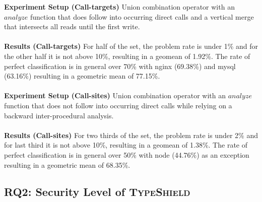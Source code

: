 \textbf{Experiment Setup (Call-targets)}
{Union combination operator with an $analyze$ function that does follow into occurring direct calls  and a vertical merge that intersects all reads until the first write.
}\\~\\
\textbf{Results (Call-targets)}{
For half of the set, the problem rate is under 1\% and for the other half it is not above 10\%, resulting in a geomean of 1.92\%. The rate of perfect classification is in general over 70\% with nginx (69.38\%) and mysql (63.16\%)  resulting in a geometric mean of 77.15\%.
}\\~\\
\textbf{Experiment Setup (Call-sites)}
{ Union combination operator with an $analyze$ function that does not follow into occurring direct calls while relying on a backward inter-procedural analysis.
}\\~\\
\textbf{Results (Call-sites)} {
For two thirds of the set, the problem rate is under 2\% and for last third it is not above 10\%, resulting in a geomean of 1.38\%.  The rate of perfect classification is in general over 50\% with node (44.76\%) as an exception resulting in a geometric mean of 68.35\%.}


%
%
%
%
\subsection{RQ2: Security Level of \textsc{TypeShield}}
\label{section:typeshieldeffectiveness}


